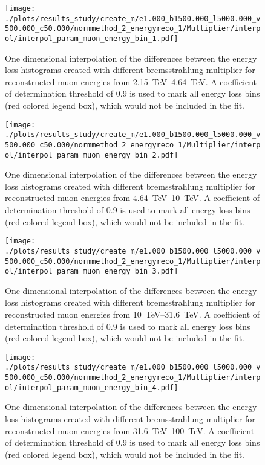 \begin{figure}[H]
    \centering
    \texttt{[image: ./plots/results\_study/create\_m/e1.000\_b1500.000\_l5000.000\_v500.000\_c50.000/normmethod\_2\_energyreco\_1/Multiplier/interpol/interpol\_param\_muon\_energy\_bin\_1.pdf]}
    \caption{One dimensional interpolation of the differences between the energy loss histograms created with different bremsstrahlung multiplier for reconstructed muon energies from \SIrange{2.15}{4.64}{TeV}. A coefficient of determination threshold of \num{0.9} is used to mark all energy loss bins (red colored legend box), which would not be included in the fit.}
    \label{fig:study_1d_interpol_mu1_nn_base}
\end{figure}

\begin{figure}[H]
    \centering
    \texttt{[image: ./plots/results\_study/create\_m/e1.000\_b1500.000\_l5000.000\_v500.000\_c50.000/normmethod\_2\_energyreco\_1/Multiplier/interpol/interpol\_param\_muon\_energy\_bin\_2.pdf]}
    \caption{One dimensional interpolation of the differences between the energy loss histograms created with different bremsstrahlung multiplier for reconstructed muon energies from \SIrange{4.64}{10}{TeV}. A coefficient of determination threshold of \num{0.9} is used to mark all energy loss bins (red colored legend box), which would not be included in the fit.}
    \label{fig:study_1d_interpol_mu2_nn_base}
\end{figure}

\begin{figure}[H]
    \centering
    \texttt{[image: ./plots/results\_study/create\_m/e1.000\_b1500.000\_l5000.000\_v500.000\_c50.000/normmethod\_2\_energyreco\_1/Multiplier/interpol/interpol\_param\_muon\_energy\_bin\_3.pdf]}
    \caption{One dimensional interpolation of the differences between the energy loss histograms created with different bremsstrahlung multiplier for reconstructed muon energies from \SIrange{10}{31.6}{TeV}. A coefficient of determination threshold of \num{0.9} is used to mark all energy loss bins (red colored legend box), which would not be included in the fit.}
    \label{fig:study_1d_interpol_mu3_nn_base}
\end{figure}

\begin{figure}[H]
    \centering
    \texttt{[image: ./plots/results\_study/create\_m/e1.000\_b1500.000\_l5000.000\_v500.000\_c50.000/normmethod\_2\_energyreco\_1/Multiplier/interpol/interpol\_param\_muon\_energy\_bin\_4.pdf]}
    \caption{One dimensional interpolation of the differences between the energy loss histograms created with different bremsstrahlung multiplier for reconstructed muon energies from \SIrange{31.6}{100}{TeV}. A coefficient of determination threshold of \num{0.9} is used to mark all energy loss bins (red colored legend box), which would not be included in the fit.}
    \label{fig:study_1d_interpol_mu4_nn_base}
\end{figure}

